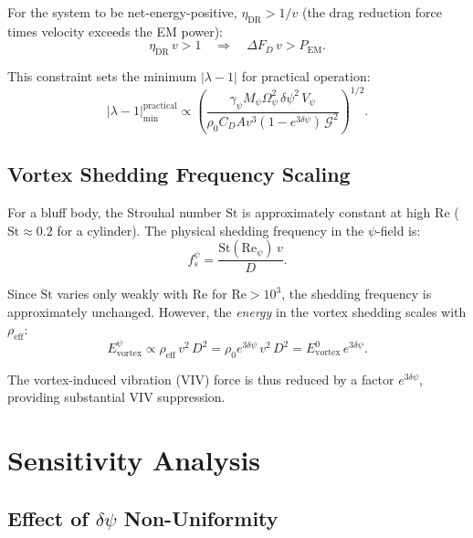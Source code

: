 \documentclass[12pt,twocolumn]{article}
\newcommand{\Reff}{\mathrm{eff}}
\newcommand{\Rey}{\mathrm{Re}}
\newcommand{\Str}{\mathrm{St}}
\newcommand{\dpsi}{\delta\psi}
\begin{document}
For the system to be net-energy-positive, $\eta_\mathrm{DR} > 1/v$
(the drag reduction force times velocity exceeds the EM power):
\begin{equation}
\eta_\mathrm{DR}\,v > 1 \quad\Longrightarrow\quad
\Delta F_D\,v > P_\mathrm{EM}.
\end{equation}

This constraint sets the minimum $|\lambda - 1|$ for practical operation:
\begin{equation}
|\lambda - 1|_\mathrm{min}^{\mathrm{practical}} \propto
\left(\frac{\gamma_\psi M_\psi\Omega_\psi^2\,\dpsi^2\,V_\psi}
{\rho_0 C_D A v^3(1-e^{3\dpsi})\,\mathcal{G}^2}\right)^{1/2}.
\end{equation}

\subsection{Vortex Shedding Frequency Scaling}

For a bluff body, the Strouhal number $\Str$ is approximately constant
at high $\Rey$ ($\Str \approx 0.2$ for a cylinder). The physical shedding
frequency in the $\psi$-field is:
\begin{equation}
f_s^\psi = \frac{\Str(\Rey_\psi)\,v}{D}.
\end{equation}

Since $\Str$ varies only weakly with $\Rey$ for $\Rey > 10^3$, the
shedding frequency is approximately unchanged. However, the \emph{energy}
in the vortex shedding scales with $\rho_\Reff$:
\begin{equation}
E_\mathrm{vortex}^\psi \propto \rho_\Reff\,v^2\,D^2
= \rho_0 e^{3\dpsi}\,v^2\,D^2 = E_\mathrm{vortex}^0\,e^{3\dpsi}.
\end{equation}

The vortex-induced vibration (VIV) force is thus reduced by a factor
$e^{3\dpsi}$, providing substantial VIV suppression.

\section{Sensitivity Analysis}
\label{sec:sensitivity}

\subsection{Effect of $\dpsi$ Non-Uniformity}
\end{document}
